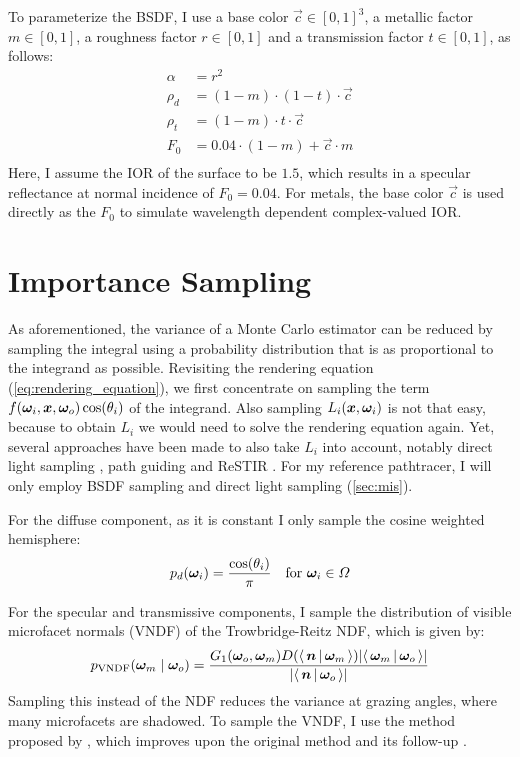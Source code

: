 To parameterize the BSDF, I use a base color $\vec{c} \in [0, 1]^3$, a metallic factor $m \in [0, 1]$, a roughness factor $r \in [0, 1]$ and a transmission factor $t \in [0, 1]$, as follows:
\begin{equation}
    \begin{aligned}
        \alpha &= r^2 \\
        \rho_d &= (1 - m) \cdot (1 - t) \cdot \vec{c} \\
        \rho_t &= (1 - m) \cdot t \cdot \vec{c} \\
        F_0 &= 0.04 \cdot (1 - m) + \vec{c} \cdot m \\
    \end{aligned}
\end{equation}
Here, I assume the IOR of the surface to be $1.5$, which results in a specular reflectance at normal incidence of $F_0 = 0.04$.
For metals, the base color $\vec{c}$ is used directly as the $F_0$ to simulate wavelength dependent complex-valued IOR.

\section{Importance Sampling}

As aforementioned, the variance of a Monte Carlo estimator can be reduced by sampling the integral using a probability distribution that is as proportional to the integrand as possible.
Revisiting the rendering equation (\ref{eq:rendering_equation}), we first concentrate on sampling the term $f({\bm{\omega}_i}, \bm{x}, {\bm{\omega}_o}) \cos(\theta_i)$ of the integrand.
Also sampling $L_i(\bm{x}, {\bm{\omega}_i})$ is not that easy, because to obtain $L_i$ we would need to solve the rendering equation again.
Yet, several approaches have been made to also take $L_i$ into account, notably direct light sampling , path guiding  and ReSTIR .
For my reference pathtracer, I will only employ BSDF sampling and direct light sampling (\ref{sec:mis}).

For the diffuse component, as it is constant I only sample the cosine weighted hemisphere:
\begin{equation}
    p_d({\bm{\omega}_i}) = \frac{\cos(\theta_i)}{\pi} \quad \text{for } {\bm{\omega}_i} \in \Omega
\end{equation}

For the specular and transmissive components, I sample the distribution of visible microfacet normals (VNDF)  of the Trowbridge-Reitz NDF, which is given by:
\begin{equation}
    p_\mathrm{VNDF}(\wm \mid \wo) = \frac{G_1(\wo, \wm) D(\NdotH) |\VdotH|}{|\NdotV|}
\end{equation}
Sampling this instead of the NDF reduces the variance at grazing angles, where many microfacets are shadowed.
To sample the VNDF, I use the method proposed by \textcite{dupuy2023}, which improves upon the original method  and its follow-up .


